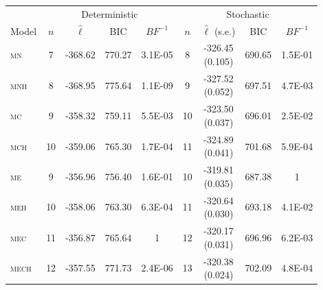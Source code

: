 \begin{table}[h!]
\centering
\small
\begin{tabular}{lcccccccc}
  \toprule
  & \multicolumn{4}{c}{Deterministic} & \multicolumn{4}{c}{Stochastic} \\
    \cmidrule(rl){2-5}\cmidrule(rl){6-9}
  Model & $n$ & $\hat{\ell}$ & BIC & ${BF}^{-1}$ & $n$ & \makecell{$\hat{\ell}$ \vspace{-.1cm} \\ \scriptsize{(s.e.)}}  & BIC  & $BF^{-1}$ \\ 
  \cmidrule(rl){2-5}\cmidrule(rl){6-9}
  \textsc{mn} &   7 & -368.62 & 770.27 & 3.1E-05 &   8 & \makecell{-326.45 \vspace{-.1cm} \\ \scriptsize{(0.105)}} & 690.65 & 1.5E-01 \\ 
   \textsc{mnh} &   8 & -368.95 & 775.64 & 1.1E-09 &   9 & \makecell{-327.52\vspace{-.1cm} \\ \scriptsize{(0.052)}} & 697.51 & 4.7E-03 \\ 
   \textsc{mc} &   9 & -358.32 & 759.11 & 5.5E-03 &  10 & \makecell{-323.50\vspace{-.1cm} \\ \scriptsize{(0.037)}} & 696.01 & 2.5E-02 \\ 
   \textsc{mch} &  10 & -359.06 & 765.30 & 1.7E-04 &  11 & \makecell{-324.89\vspace{-.1cm} \\ \scriptsize{(0.041)}} & 701.68 & 5.9E-04 \\ 
   \textsc{me} &   9 & -356.96 & \textsc{756.40} & 1.6E-01 &  10 & \makecell{\textsc{-319.81}\vspace{-.1cm} \\ \scriptsize{(0.035)}} & \textsc{687.38} & \textsc{1} \\ 
   \textsc{meh} &  10 & -358.06 & 763.30 & 6.3E-04 &  11 & \makecell{-320.64\vspace{-.1cm} \\ \scriptsize{(0.030)}} & 693.18 & 4.1E-02 \\ 
   \textsc{mec} &  11 & \textsc{-356.87} & 765.64 & \textsc{1} &  12 & \makecell{-320.17\vspace{-.1cm} \\ \scriptsize{(0.031)}} & 696.96 & 6.2E-03 \\ 
   \textsc{mech} &  12 & -357.55 & 771.73 & 2.4E-06 &  13 & \makecell{-320.38\vspace{-.1cm} \\ \scriptsize{(0.024)}} & 702.09 & 4.8E-04 \\ 

\end{tabular}
\end{table}
